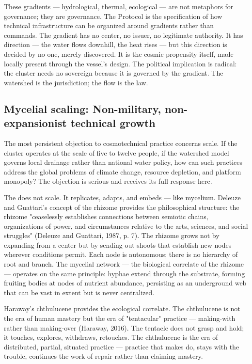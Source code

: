 These gradients — hydrological, thermal, ecological — are not metaphors for governance; they are governance. The   Protocol is the specification of how technical infrastructure can be organized around gradients rather than commands. The gradient has no center, no issuer, no legitimate authority. It has direction — the water flows downhill, the heat rises — but this direction is decided by no one, merely discovered. It is the cosmic propensity itself, made locally present through the vessel's design. The political implication is radical: the  cluster needs no sovereign because it is governed by the gradient. The watershed is the jurisdiction; the flow is the law.

\subsection{Mycelial scaling: Non-military, non-expansionist technical growth}

The most persistent objection to cosmotechnical practice concerns scale. If the  cluster operates at the scale of five to twelve people, if the watershed model governs local drainage rather than national water policy, how can such practices address the global problems of climate change, resource depletion, and platform monopoly? The objection is serious and receives its full response here.

The  does not scale. It replicates, adapts, and embeds — like mycelium. Deleuze and Guattari's concept of the rhizome provides the philosophical structure: the rhizome "ceaselessly establishes connections between semiotic chains, organizations of power, and circumstances relative to the arts, sciences, and social struggles" (Deleuze and Guattari, 1987, p. 7). The rhizome grows not by expanding from a center but by sending out shoots that establish new nodes wherever conditions permit. Each node is autonomous; there is no hierarchy of root and branch. The mycelial network — the biological correlate of the rhizome — operates on the same principle: hyphae extend through the substrate, forming fruiting bodies at nodes of nutrient abundance, persisting as an underground web that can be vast in extent but is never centralized.

Haraway's chthulucene provides the ecological correlate. The chthulucene is not the era of human mastery but the era of "tentacular" practice — making-with rather than making-over (Haraway, 2016). The tentacle does not grasp and hold; it touches, explores, withdraws, retouches. The chthulucene is the era of distributed, partial, situated practice — practice that makes do, stays with the trouble, continues the work of repair rather than claiming mastery.

